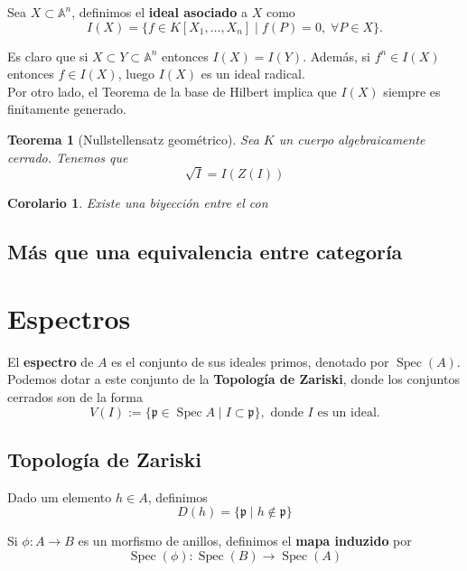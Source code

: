 \documentclass[12pt]{book}
\newtheorem{teo}{Teorema}
\newtheorem{cor}{Corolario}
\begin{document}
Sea $X \subset \mathbb{A}^n $, definimos el \textbf{ideal asociado} a $X$ como $$I(X) = \{ f \in K[X_1, \ldots , X_n]\; | \; f(P) =0, \; \forall P \in X  \}.$$

Es claro que si $X \subset Y \subset \mathbb{A}^n$ entonces $I(X) = I(Y)$. Además, si $f^n\in I(X)$ entonces $f\in I(X)$, luego $I(X)$ es un ideal radical. \\
Por otro lado, el Teorema de la base de Hilbert implica que $I(X)$ siempre es finitamente generado. 


\begin{teo}[Nullstellensatz geométrico]
	Sea $K$ un cuerpo algebraicamente cerrado. Tenemos que $$\sqrt{I} = I(Z (I))$$
\end{teo}

\begin{cor}
	Existe una biyección entre el con
\end{cor}






\subsection{Más que una equivalencia entre categoría}








\section{Espectros}


El \textbf{espectro} de $A$ es el conjunto de sus ideales primos, denotado por $\operatorname{Spec}(A)$. Podemos dotar a este conjunto de la \textbf{Topología de Zariski}, donde los conjuntos cerrados son de la forma $$ V(I) := \{ \mathfrak{p} \in \operatorname{Spec} A \;| \; I \subset \mathfrak{p} \}, \mbox{ donde } I \mbox{ es un ideal}.$$

\subsection{Topología de Zariski}



Dado um elemento $h\in A$, definimos $$D(h)= \{\mathfrak{p} \; |\; h \notin\mathfrak{p}\}$$



Si $\phi : A \rightarrow B$ es un morfismo de anillos, definimos el \textbf{mapa induzido} por $$ \operatorname{Spec}(\phi) : \operatorname{Spec} (B) \rightarrow \operatorname{Spec}(A)$$
\end{document}
